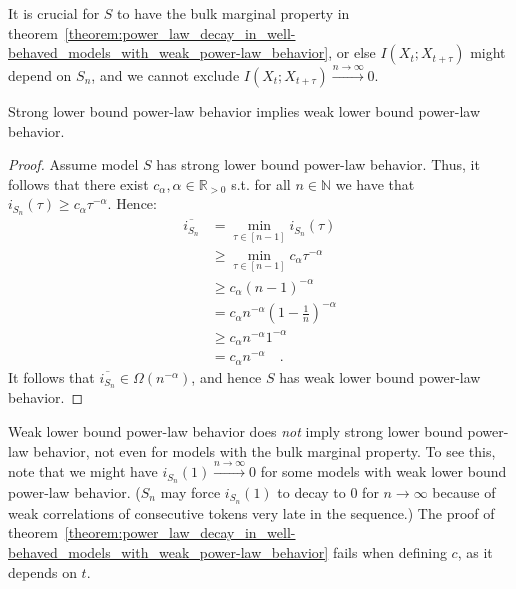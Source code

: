 \documentclass[../../main.tex]{subfiles}
\begin{document}
    \begin{remark}
        It is crucial for $S$ to have the bulk marginal property in theorem~\ref{theorem:power_law_decay_in_well-behaved_models_with_weak_power-law_behavior}, or else $I(X_{t}; X_{t + \tau})$ might depend on $S_n$, and we cannot exclude $I(X_{t}; X_{t + \tau}) \xrightarrow{n \to \infty} 0$.
    \end{remark}

    \begin{proposition}
        \label{proposition:strong_slbplb_implies_wlbplb}
        Strong lower bound power-law behavior implies weak lower bound power-law behavior.
    \end{proposition}
    \vspace{-2.5em}
    \begin{proof}
        Assume model $S$ has strong lower bound power-law behavior. Thus, it follows that there exist $c_\alpha, \alpha \in \mathbb{R}_{>0}$ s.t. for all $n \in \mathbb{N}$ we have that $i_{S_n}(\tau) \geq c_\alpha \tau^{-\alpha}$. Hence:
        \begin{align*}
            \overline{i_{S_n}} &= \min_{\tau \in [n - 1]} i_{S_n}(\tau) \\
            &\geq \min_{\tau \in [n - 1]} c_\alpha \tau^{-\alpha} \\
            &\geq c_\alpha (n - 1)^{-\alpha} \\
            &= c_\alpha n^{-\alpha} (1 - \frac{1}{n})^{-\alpha} \\
            &\geq c_\alpha n^{-\alpha} 1^{-\alpha} \\
            &= c_\alpha n^{-\alpha} \quad .
        \end{align*}
        It follows that $\overline{i_{S_n}} \in \Omega(n^{-\alpha})$, and hence $S$ has weak lower bound power-law behavior.
    \end{proof}

    \begin{remark}
        Weak lower bound power-law behavior does \emph{not} imply strong lower bound power-law behavior, not even for models with the bulk marginal property. To see this, note that we might have  $i_{S_n}(1) \xrightarrow{n \to \infty} 0$ for some models with weak lower bound power-law behavior. ($S_n$ may force $i_{S_n}(1)$ to decay to $0$ for $n \to \infty$ because of weak correlations of consecutive tokens very late in the sequence.) The proof of theorem~\ref{theorem:power_law_decay_in_well-behaved_models_with_weak_power-law_behavior} fails when defining $c$, as it depends on $t$.
    \end{remark}
\end{document}
